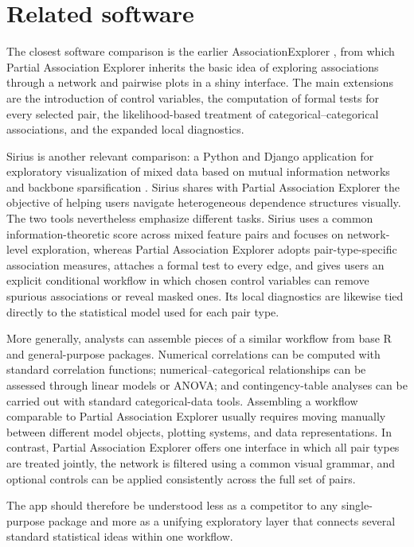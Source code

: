 \documentclass[11pt]{article}
\newcommand{\appname}{Partial Association Explorer}
\newcommand{\pkg}[1]{\textsf{#1}}
\newcommand{\proglang}[1]{\textsf{#1}}
\begin{document}
\section{Related software}
\label{sec:related}

The closest software comparison is the earlier \pkg{AssociationExplorer}
\citep{SoeteweyHeuchenneClaesDescampe2026}, from which \appname{} inherits the
basic idea of exploring associations through a network and pairwise plots in a
\pkg{shiny} interface. The main extensions are the introduction of control
variables, the computation of formal tests for every selected pair, the
likelihood-based treatment of categorical--categorical associations, and the
expanded local diagnostics.

\pkg{Sirius} is another relevant comparison: a Python and Django application
for exploratory visualization of mixed data based on mutual information
networks and backbone sparsification \citep{AdamsEtAl2021}. \pkg{Sirius} shares with
\appname{} the objective of helping users navigate heterogeneous dependence
structures visually. The two tools nevertheless emphasize different tasks.
\pkg{Sirius} uses a common information-theoretic score across mixed feature pairs and
focuses on network-level exploration, whereas \appname{} adopts
pair-type-specific association measures, attaches a formal test to every edge,
and gives users an explicit conditional workflow in which chosen control
variables can remove spurious associations or reveal masked ones. Its local
diagnostics are likewise tied directly to the statistical model used for each
pair type.

More generally, analysts can assemble pieces of a similar workflow from base
\proglang{R} and general-purpose packages. Numerical correlations can be
computed with standard correlation functions; numerical--categorical
relationships can be assessed through linear models or ANOVA; and
contingency-table analyses can be carried out with standard categorical-data
tools. Assembling a workflow comparable to \appname{} usually requires moving
manually between different model objects, plotting systems, and data
representations. In contrast, \appname{} offers one interface in which all pair
types are treated jointly, the network is filtered using a common visual
grammar, and optional controls can be applied consistently across the full set
of pairs.

The app should therefore be understood less as a competitor
to any single-purpose package and more as a unifying exploratory layer that
connects several standard statistical ideas within one workflow.
\end{document}
